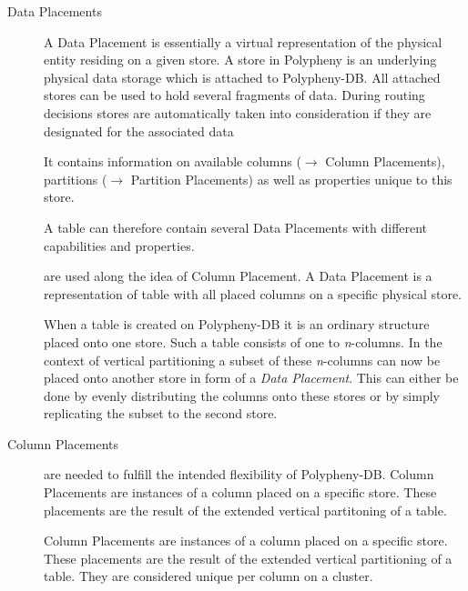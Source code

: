 \begin{description}
    \item [Data Placements] A Data Placement is essentially a virtual representation of the physical entity residing on a given store.
    A store in Polypheny is an underlying physical data storage which is 
    attached to Polypheny-DB.
    All attached stores can be used to hold several fragments of data. 
    During routing decisions stores are automatically taken into consideration if they are designated for the associated data 
    
    It contains information on available columns ($\rightarrow$ Column Placements), partitions ($\rightarrow$ Partition Placements)
    as well as properties unique to this store.
    
    A table can therefore contain several Data Placements with different capabilities and properties. 
    
    are used along the idea of Column Placement. A Data Placement 
        is a representation of table with all placed columns on a specific physical store.
    
        When a table is created on Polypheny-DB it is an ordinary structure placed onto 
        one store. Such a table consists of one to \textit{n}-columns.
        In the context of vertical partitioning a subset of these \textit{n}-columns can now 
        be placed onto another store in form of a \textit{Data Placement}.
        This can either be done by evenly distributing the columns onto these stores 
        or by simply replicating the subset to the second store.\\

    \item [Column Placements] 
    are needed to fulfill the intended flexibility of Polypheny-DB. 
        Column Placements are instances of a column placed on a specific store.
        These placements are the result of the extended vertical partitoning of a table.
        
    Column Placements are instances of a column placed on a specific store.
    These placements are the result of the extended vertical partitioning of a table.
    They are considered unique per column on a cluster.
    

\end{description}
